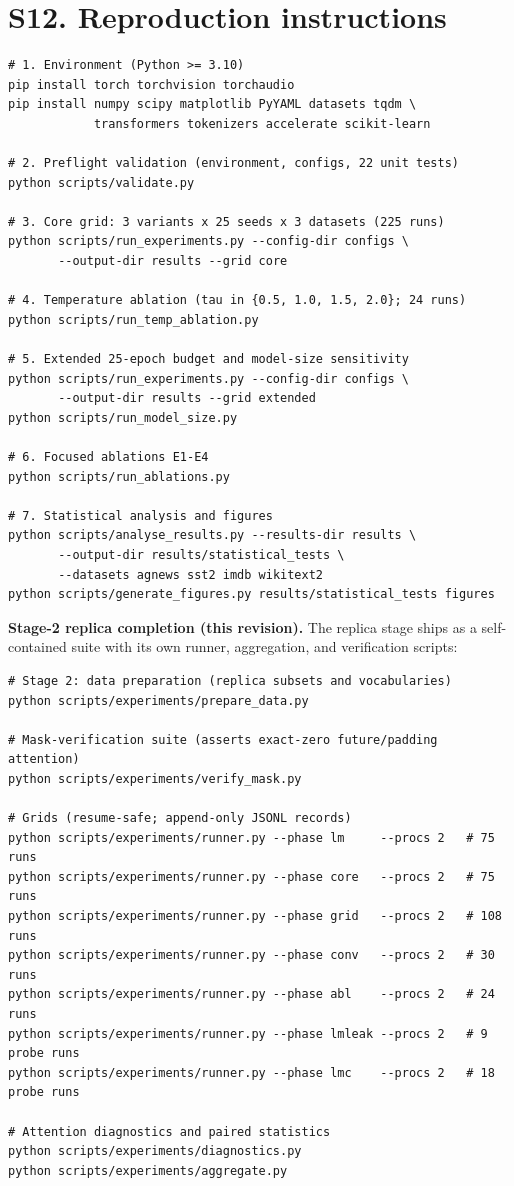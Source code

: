 \documentclass[10pt,a4paper]{article}
\begin{document}
\section*{S12. Reproduction instructions}\label{sup:repro}
\begin{verbatim}
# 1. Environment (Python >= 3.10)
pip install torch torchvision torchaudio
pip install numpy scipy matplotlib PyYAML datasets tqdm \
            transformers tokenizers accelerate scikit-learn

# 2. Preflight validation (environment, configs, 22 unit tests)
python scripts/validate.py

# 3. Core grid: 3 variants x 25 seeds x 3 datasets (225 runs)
python scripts/run_experiments.py --config-dir configs \
       --output-dir results --grid core

# 4. Temperature ablation (tau in {0.5, 1.0, 1.5, 2.0}; 24 runs)
python scripts/run_temp_ablation.py

# 5. Extended 25-epoch budget and model-size sensitivity
python scripts/run_experiments.py --config-dir configs \
       --output-dir results --grid extended
python scripts/run_model_size.py

# 6. Focused ablations E1-E4
python scripts/run_ablations.py

# 7. Statistical analysis and figures
python scripts/analyse_results.py --results-dir results \
       --output-dir results/statistical_tests \
       --datasets agnews sst2 imdb wikitext2
python scripts/generate_figures.py results/statistical_tests figures
\end{verbatim}

\vspace{4pt}
\noindent\textbf{Stage-2 replica completion (this revision).} The replica stage
ships as a self-contained suite with its own runner, aggregation, and
verification scripts:

\begin{verbatim}
# Stage 2: data preparation (replica subsets and vocabularies)
python scripts/experiments/prepare_data.py

# Mask-verification suite (asserts exact-zero future/padding attention)
python scripts/experiments/verify_mask.py

# Grids (resume-safe; append-only JSONL records)
python scripts/experiments/runner.py --phase lm     --procs 2   # 75 runs
python scripts/experiments/runner.py --phase core   --procs 2   # 75 runs
python scripts/experiments/runner.py --phase grid   --procs 2   # 108 runs
python scripts/experiments/runner.py --phase conv   --procs 2   # 30 runs
python scripts/experiments/runner.py --phase abl    --procs 2   # 24 runs
python scripts/experiments/runner.py --phase lmleak --procs 2   # 9 probe runs
python scripts/experiments/runner.py --phase lmc    --procs 2   # 18 probe runs

# Attention diagnostics and paired statistics
python scripts/experiments/diagnostics.py
python scripts/experiments/aggregate.py
\end{verbatim}
\end{document}
